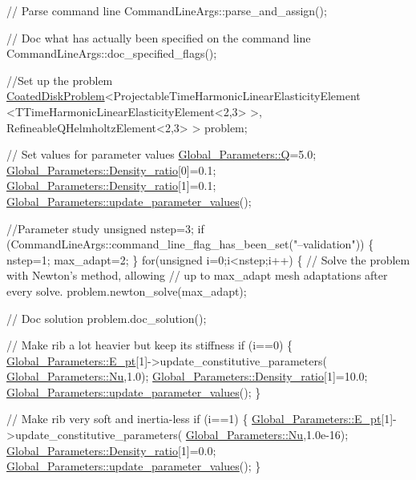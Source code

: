 \begin{DoxyCodeInclude}
{{{{{{{{{ \textcolor{comment}{// Parse command line}
 CommandLineArgs::parse\_and\_assign(); 
 
 \textcolor{comment}{// Doc what has actually been specified on the command line}
 CommandLineArgs::doc\_specified\_flags();

 \textcolor{comment}{//Set up the problem}
 \hyperlink{classCoatedDiskProblem}{CoatedDiskProblem}<ProjectableTimeHarmonicLinearElasticityElement
                   <TTimeHarmonicLinearElasticityElement<2,3> >,
                   RefineableQHelmholtzElement<2,3> > problem; 


 \textcolor{comment}{// Set values for parameter values}
 \hyperlink{namespaceGlobal__Parameters_a7814fddf663e56168174a42d2cd6b4c1}{Global\_Parameters::Q}=5.0; 
 \hyperlink{namespaceGlobal__Parameters_a517d4c31b8bce6563c2f605266dd9679}{Global\_Parameters::Density\_ratio}[0]=0.1; 
 \hyperlink{namespaceGlobal__Parameters_a517d4c31b8bce6563c2f605266dd9679}{Global\_Parameters::Density\_ratio}[1]=0.1; 
 \hyperlink{namespaceGlobal__Parameters_ae0f9a80fb7510dbfbbef22582da231b7}{Global\_Parameters::update\_parameter\_values}();
 
 \textcolor{comment}{//Parameter study}
 \textcolor{keywordtype}{unsigned} nstep=3; 
 \textcolor{keywordflow}{if} (CommandLineArgs::command\_line\_flag\_has\_been\_set(\textcolor{stringliteral}{"--validation"}))
  \{
   nstep=1;
   max\_adapt=2;
  \}
 \textcolor{keywordflow}{for}(\textcolor{keywordtype}{unsigned} i=0;i<nstep;i++)
  \{
   \textcolor{comment}{// Solve the problem with Newton's method, allowing}
   \textcolor{comment}{// up to max\_adapt mesh adaptations after every solve.}
   problem.newton\_solve(max\_adapt);

   \textcolor{comment}{// Doc solution}
   problem.doc\_solution();

   \textcolor{comment}{// Make rib a lot heavier but keep its stiffness}
   \textcolor{keywordflow}{if} (i==0)
    \{
     \hyperlink{namespaceGlobal__Parameters_a73c731fa617a9d92851e4195493262e7}{Global\_Parameters::E\_pt}[1]->update\_constitutive\_parameters(
      \hyperlink{namespaceGlobal__Parameters_a20fccdcfa2c15ad8b951b9ada3bb1661}{Global\_Parameters::Nu},1.0);
     \hyperlink{namespaceGlobal__Parameters_a517d4c31b8bce6563c2f605266dd9679}{Global\_Parameters::Density\_ratio}[1]=10.0; 
     \hyperlink{namespaceGlobal__Parameters_ae0f9a80fb7510dbfbbef22582da231b7}{Global\_Parameters::update\_parameter\_values}();
    \}

   \textcolor{comment}{// Make rib very soft and inertia-less}
   \textcolor{keywordflow}{if} (i==1)
    \{
     \hyperlink{namespaceGlobal__Parameters_a73c731fa617a9d92851e4195493262e7}{Global\_Parameters::E\_pt}[1]->update\_constitutive\_parameters(
      \hyperlink{namespaceGlobal__Parameters_a20fccdcfa2c15ad8b951b9ada3bb1661}{Global\_Parameters::Nu},1.0e-16);
     \hyperlink{namespaceGlobal__Parameters_a517d4c31b8bce6563c2f605266dd9679}{Global\_Parameters::Density\_ratio}[1]=0.0; 
     \hyperlink{namespaceGlobal__Parameters_ae0f9a80fb7510dbfbbef22582da231b7}{Global\_Parameters::update\_parameter\_values}();
    \}
   
}}}}}}}}}
\end{DoxyCodeInclude}
